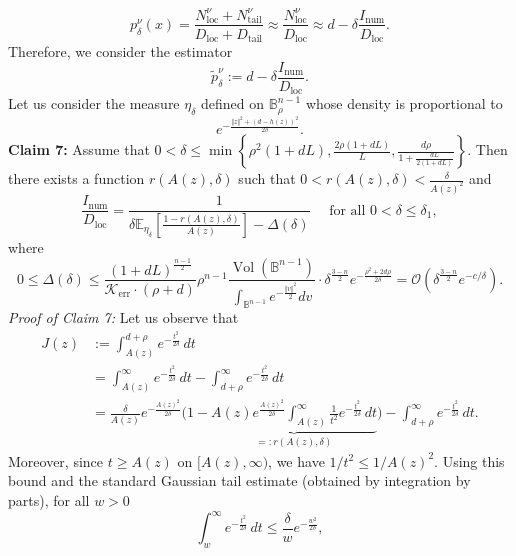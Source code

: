 \documentclass[11pt]{amsart}
\newcommand{\1}{\mathds{1}}
\theoremstyle{definition}
\theoremstyle{remark}
\theoremstyle{definition}
\begin{document}
$$
p_{\delta}^{\nu}(x)=\frac{N_{\operatorname{loc}}^{\nu}+N_{\operatorname{tail}}^{\nu}}{D_{\operatorname{loc}}+D_{\operatorname{tail}}} \approx \frac{N_{\operatorname{loc}}^{\nu}}{D_{\operatorname{loc}}}\approx  d-\delta \frac{I_{\operatorname{num}}}{D_{\operatorname{loc}}}.
$$
Therefore, we consider the estimator
\begin{equation*}
    \tilde{p}_{\delta}^{\nu}:=d-\delta \frac{I_{\operatorname{num}}}{D_{\operatorname{loc}}}.
\end{equation*}
Let us consider the measure $\eta_{\delta}$ defined on $\mathbb{B}^{n-1}_{\rho}$ whose density is proportional to 
$$e^{-\frac{\Vert z\Vert^2+(d-h(z))^2}{2\delta}}.$$
\textbf{Claim 7:}  Assume that $0<\delta\leq \min \left\{ \rho^2(1+dL),  \frac{2\rho(1+dL)}{L},  \frac{d\rho}{1 + \frac{dL}{2(1+dL)}} \right\}$. Then there exists a function $r(A(z),\delta)$ such that $0<r(A(z),\delta)<\frac{\delta}{A(z)^2}$ and
\begin{equation*}
    \frac{I_{\operatorname{num}}}{D_{\operatorname{loc}}}=\frac{1}{\delta \mathbb{E}_{\eta_{\delta}}\left[\frac{1-r(A(z),\delta)}{A(z)}\right]-\Delta(\delta)} \quad \textrm{ for all } 0<\delta \leq \delta_1,
\end{equation*}
where
$$
0\leq \Delta(\delta)\leq \frac{(1+dL)^{\frac{n-1}{2}} }{\mathcal{K}_{\operatorname{err}} \cdot (\rho +d)} \rho^{n-1}  \frac{\operatorname{Vol}(\mathbb{B}^{n-1})}{\int_{\mathbb{B}^{n-1}} e^{-\frac{\Vert v\Vert^2}{2}}dv} \cdot  \delta^{\frac{3-n}{2}}e^{-\frac{\rho^2+2d\rho}{2\delta}}=\mathcal{O}( \delta^{\frac{3-n}{2}} e^{-c/\delta}).
$$
\emph{Proof of Claim 7:} Let us observe that 
\begin{equation*}
\begin{aligned}
J(z)
&:=\int_{A(z)}^{d+\rho} e^{-\frac{t^2}{2\delta}}\,dt \\
&=\int_{A(z)}^{\infty} e^{-\frac{t^2}{2\delta}}\,dt-\int_{d+\rho}^{\infty} e^{-\frac{t^2}{2\delta}}\,dt \\
&=\frac{\delta}{A(z)}e^{-\frac{A(z)^2}{2\delta}}
\big(1-\underbrace{A(z)e^{\frac{A(z)^2}{2\delta}}\int_{A(z)}^{\infty} \frac{1}{t^2}e^{-\frac{t^2}{2\delta}}\,dt}_{=:r(A(z),\delta)}\big)-\int_{d+\rho}^{\infty} e^{-\frac{t^2}{2\delta}}\,dt.
\end{aligned}
\end{equation*}
Moreover, since $t\ge A(z)$ on $[A(z),\infty)$, we have $1/t^2 \le 1/A(z)^2$. Using this bound and the
standard Gaussian tail estimate (obtained by integration by parts), for all $w>0$
\begin{equation}\label{Mills}
\int_{w}^{\infty} e^{-\frac{t^2}{2\delta}}\,dt \le \frac{\delta}{w}e^{-\frac{w^2}{2\delta}},    
\end{equation}
\end{document}
